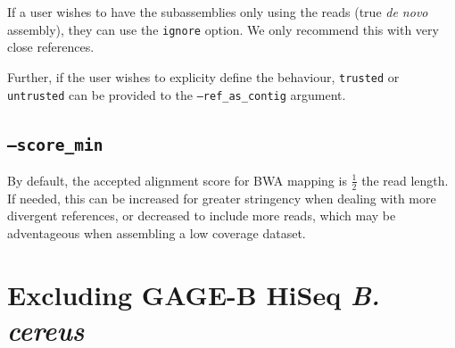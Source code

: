 \documentclass[10pt]{article}
\begin{document}
If a user wishes to have the subassemblies only using the reads (true \textit{de novo} assembly), they can use the \texttt{ignore} option.  We only recommend this with very close references.

Further, if the user wishes to explicity define the behaviour, \texttt{trusted} or \texttt{untrusted} can be provided to the \texttt{--ref\_as\_contig} argument.

\subsection*{\texttt{--score\_min}}
By default, the accepted alignment score for BWA mapping is $\frac{1}{2}$ the read length.  If needed, this can be increased for greater stringency when dealing with more divergent references, or decreased to include more reads, which may be adventageous when assembling a low coverage dataset.

\section*{Excluding GAGE-B HiSeq \textit{B. cereus}}
\end{document}
